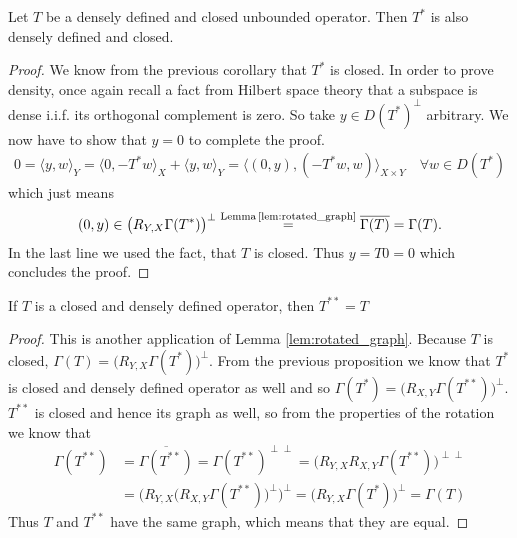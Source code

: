 \documentclass[../main.tex]{subfiles}
\begin{document}
\begin{proposition}\label{prop:adjoint_of_densely_defined_closed}
    Let $T$ be a densely defined and closed unbounded operator.
    Then $T^*$ is also densely defined and closed.
\end{proposition}
\begin{proof}
    We know from the previous corollary that $T^*$ is closed. 
    In order to prove density, once again recall a fact from Hilbert space
    theory that a subspace is dense i.i.f. its orthogonal complement 
    is zero. So take $y \in D(T^*)^\perp$ arbitrary. We now have to show that 
    $y=0$ to complete the proof.
    \begin{align*}
        0 = \langle y, w \rangle_Y 
        = \langle 0, -T^*w \rangle _X + \langle y, w \rangle _Y
        = \langle (0,y), (-T^*w,w) \rangle _{X\times Y} \quad \forall w \in D(T^*)
    \end{align*}
    which just means
    \begin{align*}
        (0,y) \in \big(R_{Y,X}\Gamma(T^*)\big)^\perp 
        \stackrel{\text{Lemma\,\ref{lem:rotated_graph}} }{=} \overline{\Gamma(T)}
        = \Gamma(T).
    \end{align*}
    In the last line we used the fact, that $T$ is closed. 
    Thus $y = T0 = 0$ which concludes the proof.
\end{proof}

\begin{proposition}\label{prop:T_starstar_equals_T}
    If $T$ is a closed and densely defined operator, 
    then $T^{**} = T$
\end{proposition}
\begin{proof}
    This is another application of Lemma \ref{lem:rotated_graph}. 
    Because $T$ is closed, $\Gamma(T) = \big( R_{Y,X}\Gamma(T^*)\big)^\perp$. 
    From the previous proposition we know that $T^*$ is closed and 
    densely defined operator as well and so $\Gamma(T^*) = \big( R_{X,Y}\Gamma(T^{**})\big)^\perp$.
    $T^{**}$ is closed and hence its graph as well, so
    from the properties of the rotation we know that
    \begin{align*}
        \Gamma(T^{**}) 
        &= \overline{\Gamma(T^{**})} 
        = \Gamma(T^{**})^{\perp \perp}
        = \big( R_{Y,X} R_{X,Y}\Gamma(T^{**})   \big)^{\perp \perp}
        \\ &= \Big( R_{Y,X}\big(R_{X,Y}\Gamma(T^{**})\big)^{\perp} \Big)^\perp
        = \Big( R_{Y,X} \Gamma(T^*) \Big)^\perp
        = \Gamma(T)
    \end{align*}
    Thus $T$ and $T^{**}$ have the same graph, which means that they are equal.
\end{proof}
\end{document}
